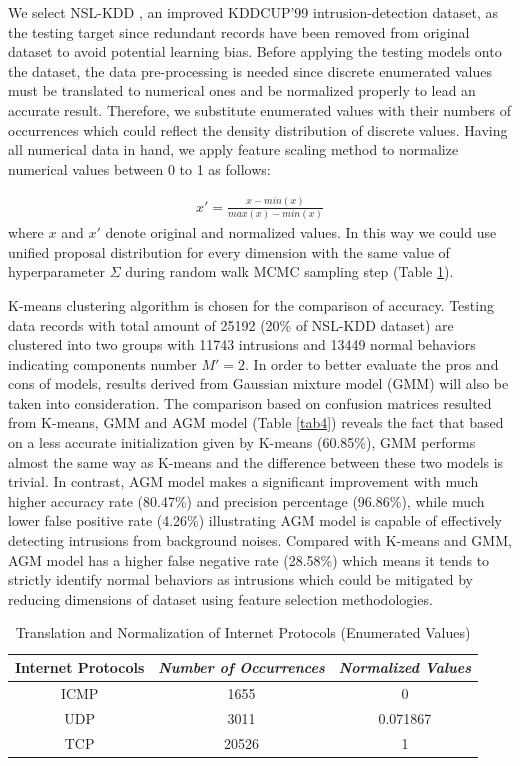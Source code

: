 \documentclass[conference]{IEEEtran}
\begin{document}
We select NSL-KDD \cite{b12}, an improved KDDCUP'99 intrusion-detection dataset, as the testing target since redundant records have been removed from original dataset to avoid potential learning bias. Before applying the testing models onto the dataset, the data pre-processing is needed since discrete enumerated values must be translated to numerical ones and be normalized properly to lead an accurate result. Therefore, we substitute enumerated values with their numbers of occurrences which could reflect the density distribution of discrete values. Having all numerical data in hand, we apply feature scaling method to normalize numerical values between 0 to 1 as follows:

\begin{align}
x' = \frac{x - min(x)}{max(x) - min(x)}
\label{eq:13}
\end{align}
where $x$ and $x'$ denote original and normalized values. In this way we could use unified proposal distribution for every dimension with the same value of hyperparameter $\Sigma$ during random walk MCMC sampling step (Table \ref{tab3}).

K-means clustering algorithm \cite{b16} is chosen for the comparison of accuracy. Testing data records with total amount of 25192 (20\% of NSL-KDD dataset) are clustered into two groups with 11743 intrusions and 13449 normal behaviors indicating components number $M' = 2$. In order to better evaluate the pros and cons of models, results derived from Gaussian mixture model (GMM) will also be taken into consideration. The comparison based on confusion matrices resulted from K-means, GMM and AGM model (Table \ref{tab4}) reveals the fact that based on a less accurate initialization given by K-means (60.85\%), GMM performs almost the same way as K-means and the difference between these two models is trivial. In contrast, AGM model makes a significant improvement with much higher accuracy rate (80.47\%) and precision percentage (96.86\%), while much lower false positive rate (4.26\%) illustrating AGM model is capable of effectively detecting intrusions from background noises. Compared with K-means and GMM, AGM model has a higher false negative rate (28.58\%) which means it tends to strictly identify normal behaviors as intrusions which could be mitigated by reducing dimensions of dataset using feature selection methodologies.


\begin{table}
\caption{Translation and Normalization of Internet Protocols (Enumerated Values)}
\begin{center}
\begin{tabular}{|c|c|c|}
\hline
\multicolumn{1}{|p{2cm}|}{\centering \textbf{Internet Protocols}} & \multicolumn{1}{|p{2cm}|}{\centering \textbf{\textit{Number of Occurrences}}} & \multicolumn{1}{|p{2cm}|}{\centering \textbf{\textit{Normalized Values}}}\\
\hline
ICMP & 1655 & 0\\
UDP & 3011 & 0.071867 \\
TCP & 20526 & 1 \\
\hline
\end{tabular}
\label{tab3}
\end{center}
\end{table}
\end{document}

